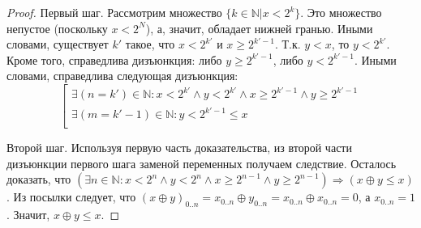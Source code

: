 \begin{proof}
Первый шаг. Рассмотрим множество $\{k \in \mathds{N} | x < 2^k\}$. Это множество непустое (поскольку $x < 2^N$), а, значит, обладает нижней гранью. Иными словами, существует $k'$ такое, что $x < 2^{k'}$ и $x \geqslant 2^{k'-1}$. Т.к. $y < x$, то $y < 2^{k'}$. Кроме того, справедлива дизъюнкция: либо $y \geqslant 2^{k'-1}$, либо $y < 2^{k'-1}$. Иными словами, справедлива следующая дизъюнкция:
$$\left[\begin{array}{l}
\exists (n = k') \in \mathds{N} : x < 2^{k'} \wedge y < 2^{k'} \wedge x \geqslant 2^{k'-1} \wedge y \geqslant 2^{k'-1}\\
\exists (m = k'{-}1) \in \mathds{N} : y < 2^{k'-1} \leqslant x\\
\end{array}\right.$$

Второй шаг. Используя первую часть доказательства, из второй части дизъюнкции первого шага заменой переменных получаем следствие. Осталось доказать, что $(\exists n \in \mathds{N} : x < 2^n \wedge y < 2^n \wedge x \geqslant 2^{n-1} \wedge y \geqslant 2^{n-1}) \Rightarrow (x \oplus y \leqslant x)$. Из посылки следует, что $(x \oplus y)_{0..n} = x_{0..n} \oplus y_{0..n} = x_{0..n} \oplus x_{0..n} = 0$, а $x_{0..n} = 1$. Значит, $x\oplus y \leqslant x$.
\end{proof}

